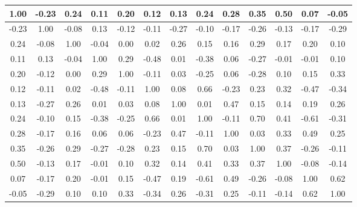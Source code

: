 \begin{tabular}{|c|c|c|c|c|c|c|c|c|c|c|c|c|}
\hline
1.00&-0.23&0.24&0.11&0.20&0.12&0.13&0.24&0.28&0.35&0.50&0.07&-0.05\\\hline
-0.23&1.00&-0.08&0.13&-0.12&-0.11&-0.27&-0.10&-0.17&-0.26&-0.13&-0.17&-0.29\\\hline
0.24&-0.08&1.00&-0.04&0.00&0.02&0.26&0.15&0.16&0.29&0.17&0.20&0.10\\\hline
0.11&0.13&-0.04&1.00&0.29&-0.48&0.01&-0.38&0.06&-0.27&-0.01&-0.01&0.10\\\hline
0.20&-0.12&0.00&0.29&1.00&-0.11&0.03&-0.25&0.06&-0.28&0.10&0.15&0.33\\\hline
0.12&-0.11&0.02&-0.48&-0.11&1.00&0.08&0.66&-0.23&0.23&0.32&-0.47&-0.34\\\hline
0.13&-0.27&0.26&0.01&0.03&0.08&1.00&0.01&0.47&0.15&0.14&0.19&0.26\\\hline
0.24&-0.10&0.15&-0.38&-0.25&0.66&0.01&1.00&-0.11&0.70&0.41&-0.61&-0.31\\\hline
0.28&-0.17&0.16&0.06&0.06&-0.23&0.47&-0.11&1.00&0.03&0.33&0.49&0.25\\\hline
0.35&-0.26&0.29&-0.27&-0.28&0.23&0.15&0.70&0.03&1.00&0.37&-0.26&-0.11\\\hline
0.50&-0.13&0.17&-0.01&0.10&0.32&0.14&0.41&0.33&0.37&1.00&-0.08&-0.14\\\hline
0.07&-0.17&0.20&-0.01&0.15&-0.47&0.19&-0.61&0.49&-0.26&-0.08&1.00&0.62\\\hline
-0.05&-0.29&0.10&0.10&0.33&-0.34&0.26&-0.31&0.25&-0.11&-0.14&0.62&1.00\\\hline
\end{tabular}
